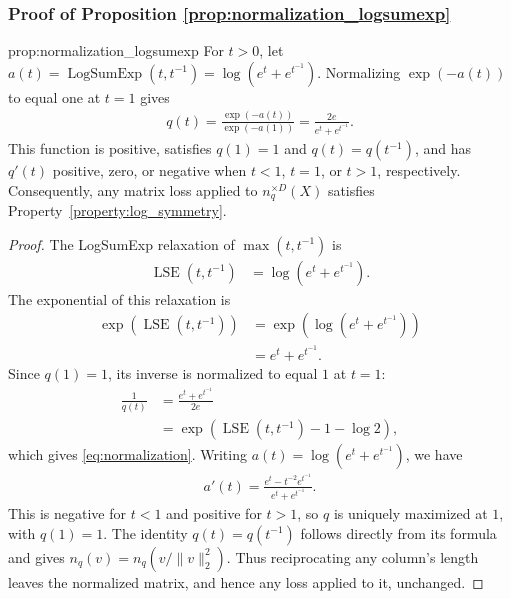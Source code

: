 \subsubsection{Proof of Proposition \ref{prop:normalization_logsumexp}}
\label{proof:normalization_logsumexp}

\begin{restatedproposition}{prop:normalization_logsumexp}
For $t>0$, let $a(t)=\operatorname{LogSumExp}(t,t^{-1})=\log(e^t+e^{t^{-1}})$.
Normalizing $\exp(-a(t))$ to equal one at $t=1$ gives
\begin{align}
q(t)=\frac{\exp(-a(t))}{\exp(-a(1))}=\frac{2e}{e^t+e^{t^{-1}}}.
\end{align}
This function is positive, satisfies $q(1)=1$ and $q(t)=q(t^{-1})$, and has $q'(t)$ positive, zero, or negative when $t<1$, $t=1$, or $t>1$, respectively.
Consequently, any matrix loss applied to $n_q^{\times D}(X)$ satisfies Property~\ref{property:log_symmetry}.
\end{restatedproposition}

\begin{proof}
The LogSumExp relaxation of $\max(t,t^{-1})$ is
\begin{align}
\operatorname{LSE}(t,t^{-1})
&=
\log\left(e^t+e^{t^{-1}}\right).
\end{align}
The exponential of this relaxation is
\begin{align}
\exp\left(\operatorname{LSE}(t,t^{-1})\right)
&=
\exp\left(\log\left(e^t+e^{t^{-1}}\right)\right) \\
&=
e^t+e^{t^{-1}}.
\end{align}
Since $q(1)=1$, its inverse is normalized to equal $1$ at $t=1$:
\begin{align}
\frac{1}{q(t)}
&=
\frac{e^t+e^{t^{-1}}}{2e} \\
&=
\exp\left(\operatorname{LSE}(t,t^{-1}) - 1 - \log 2\right),
\end{align}
which gives \eqref{eq:normalization}.
Writing $a(t)=\log(e^t+e^{t^{-1}})$, we have
\begin{align}
a'(t)=\frac{e^t-t^{-2}e^{t^{-1}}}{e^t+e^{t^{-1}}}.
\end{align}
This is negative for $t<1$ and positive for $t>1$, so $q$ is uniquely maximized at $1$, with $q(1)=1$.
The identity $q(t)=q(t^{-1})$ follows directly from its formula and gives $n_q(v)=n_q(v/\|v\|_2^2)$.
Thus reciprocating any column's length leaves the normalized matrix, and hence any loss applied to it, unchanged.
\end{proof}


